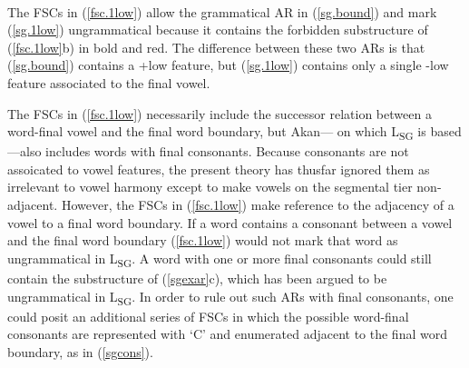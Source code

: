 \documentclass[,doc,floatsintext]{apa6}
\theoremstyle{definition}
\theoremstyle{definition}
\theoremstyle{definition}
\theoremstyle{remark}
\begin{document}
\begin{exe}
 \label{sg.1low} \\
\end{exe}

\noindent The FSCs in (\ref{fsc.1low}) allow the grammatical AR in
(\ref{sg.bound}) and mark (\ref{sg.1low}) ungrammatical because it
contains the forbidden substructure of (\ref{fsc.1low}b) in bold and
red. The difference between these two ARs is that (\ref{sg.bound})
contains a +low feature, but (\ref{sg.1low}) contains only a single -low
feature associated to the final vowel.

The FSCs in (\ref{fsc.1low}) necessarily include the successor relation
between a word-final vowel and the final word boundary, but Akan--- on
which L\textsubscript{SG} is based ---also includes words with final
consonants. Because consonants are not assoicated to vowel features, the
present theory has thusfar ignored them as irrelevant to vowel harmony
except to make vowels on the segmental tier non-adjacent. However, the
FSCs in (\ref{fsc.1low}) make reference to the adjacency of a vowel to a
final word boundary. If a word contains a consonant between a vowel and
the final word boundary (\ref{fsc.1low}) would not mark that word as
ungrammatical in L\textsubscript{SG}. A word with one or more final
consonants could still contain the substructure of (\ref{sgexar}c),
which has been argued to be ungrammatical in L\textsubscript{SG}. In
order to rule out such ARs with final consonants, one could posit an
additional series of FSCs in which the possible word-final consonants
are represented with `C' and enumerated adjacent to the final word
boundary, as in (\ref{sgcons}).
\end{document}
